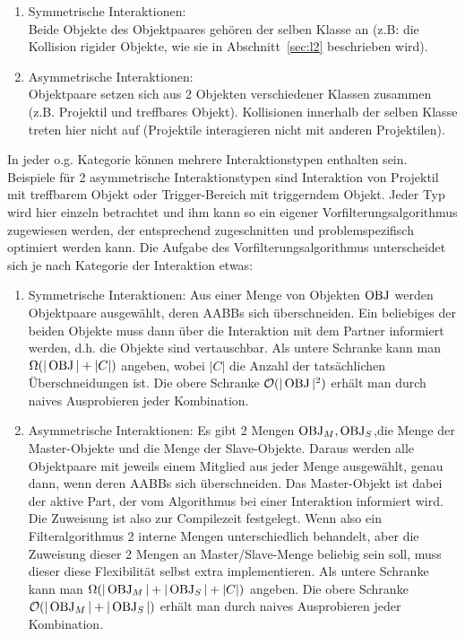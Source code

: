 \begin{enumerate}
\item Symmetrische Interaktionen:\\
Beide Objekte des Objektpaares gehören der selben Klasse an (z.B: die Kollision rigider Objekte, wie sie in Abschnitt~\ref{sec:l2} beschrieben wird).
\item Asymmetrische Interaktionen:\\
Objektpaare setzen sich aus 2 Objekten verschiedener Klassen zusammen (z.B. Projektil und treffbares Objekt). Kollisionen innerhalb der selben Klasse treten hier nicht auf (Projektile interagieren nicht mit anderen Projektilen).
\end{enumerate}

In jeder o.g. Kategorie können mehrere Interaktionstypen enthalten sein. Beispiele für 2 asymmetrische Interaktionstypen sind Interaktion von Projektil mit treffbarem Objekt oder Trigger-Bereich mit triggerndem Objekt. Jeder Typ wird hier einzeln betrachtet und ihm kann so ein eigener Vorfilterungsalgorithmus zugewiesen werden, der entsprechend zugeschnitten und problemspezifisch optimiert werden kann.
Die Aufgabe des Vorfilterungsalgorithmus unterscheidet sich je nach Kategorie der Interaktion etwas:
\begin{enumerate}
\item Symmetrische Interaktionen: Aus einer Menge von Objekten $\operatorname{OBJ}$ werden Objektpaare ausgewählt, deren AABBs sich überschneiden. Ein beliebiges der beiden Objekte muss dann über die Interaktion mit dem Partner informiert werden, d.h. die Objekte sind vertauschbar.
Als untere Schranke kann man $\Omega (|\operatorname{OBJ}|+|C|)$ angeben, wobei $|C|$ die Anzahl der tatsächlichen Überschneidungen ist. Die obere Schranke $\mathcal{O}(|\operatorname{OBJ}|^2)$ erhält man durch naives Ausprobieren jeder Kombination.
\item Asymmetrische Interaktionen: Es gibt 2 Mengen $\operatorname{OBJ}_M, \operatorname{OBJ}_S$,die Menge der Master-Objekte und die Menge der Slave-Objekte. Daraus werden alle Objektpaare mit jeweils einem Mitglied aus jeder Menge ausgewählt, genau dann, wenn deren AABBs sich überschneiden. Das Master-Objekt ist dabei der aktive Part, der vom Algorithmus bei einer Interaktion informiert wird. Die Zuweisung ist also zur Compilezeit festgelegt. Wenn also ein Filteralgorithmus 2 interne Mengen unterschiedlich behandelt, aber die Zuweisung dieser 2 Mengen an Master/Slave-Menge beliebig sein soll, muss dieser diese Flexibilität selbst extra implementieren. Als untere Schranke kann man $\Omega(|\operatorname{OBJ}_M|+|\operatorname{OBJ}_S|+|C|)$ angeben. Die obere Schranke $\mathcal{O}(|\operatorname{OBJ}_M|+|\operatorname{OBJ}_S|)$ erhält man durch naives Ausprobieren jeder Kombination.
\end{enumerate}

